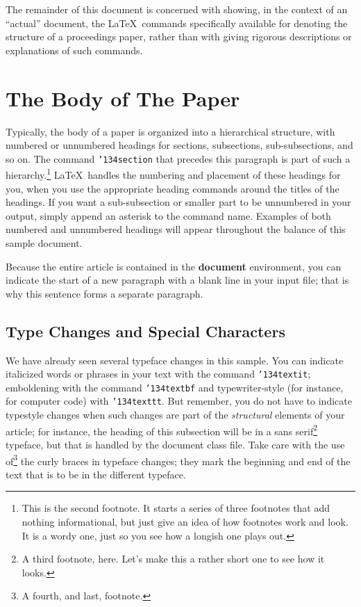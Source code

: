 \documentclass[twoside,letterpaper]{soups}
\begin{document}
The remainder of this document is concerned with showing, in
the context of an ``actual'' document, the \LaTeX\ commands
specifically available for denoting the structure of a
proceedings paper, rather than with giving rigorous descriptions
or explanations of such commands.

\section{The {\secit Body} of The Paper}
Typically, the body of a paper is organized
into a hierarchical structure, with numbered or unnumbered
headings for sections, subsections, sub-subsections, and so on. 
The command \texttt{{\char'134}section} that
precedes this paragraph is part of such a
hierarchy.\footnote{This is the second footnote.  It
starts a series of three footnotes that add nothing
informational, but just give an idea of how footnotes work
and look. It is a wordy one, just so you see
how a longish one plays out.} \LaTeX\ handles the numbering
and placement of these headings for you, when you use
the appropriate heading commands around the titles
of the headings.  If you want a sub-subsection or
smaller part to be unnumbered in your output, simply append an
asterisk to the command name.  Examples of both
numbered and unnumbered headings will appear throughout the
balance of this sample document.

Because the entire article is contained in
the \textbf{document} environment, you can indicate the
start of a new paragraph with a blank line in your
input file; that is why this sentence forms a separate paragraph.

\subsection{Type Changes and {\subsecit Special} Characters}
We have already seen several typeface changes in this sample.  You
can indicate italicized words or phrases in your text with
the command \texttt{{\char'134}textit}; emboldening with the
command \texttt{{\char'134}textbf}
and typewriter-style (for instance, for computer code) with
\texttt{{\char'134}texttt}.  But remember, you do not
have to indicate typestyle changes when such changes are
part of the \textit{structural} elements of your
article; for instance, the heading of this subsection will
be in a sans serif\footnote{A third footnote, here.
Let's make this a rather short one to
see how it looks.} typeface, but that is handled by the
document class file. Take care with the use
of\footnote{A fourth, and last, footnote.}
the curly braces in typeface changes; they mark
the beginning and end of
the text that is to be in the different typeface.
\end{document}
